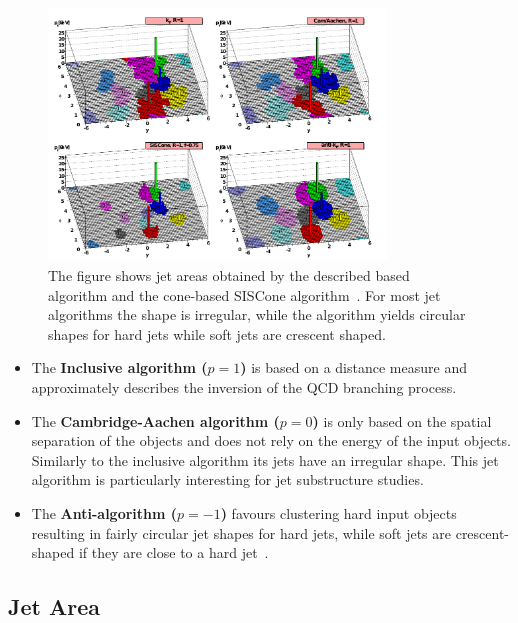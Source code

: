 \begin{figure}[htb]
    \centering
    \includegraphics[width=0.8\textwidth]{figures/jet_reconstruction/jet_shapes.pdf}
    \caption{The figure shows jet areas obtained by the described \kt based algorithm
        and the cone-based SISCone algorithm~\cite{Salam:2009jx}. For most jet
        algorithms the shape is irregular, while the \antikt algorithm yields
        circular shapes for hard jets while soft jets are crescent shaped.}
    \label{fig:jet_shapes}
\end{figure}

\begin{itemize}
    \item The \textbf{Inclusive \kt algorithm ($p=1$)} is based on a \ptsq
        distance measure and approximately describes the inversion
        of the QCD branching process.
    \item The \textbf{Cambridge-Aachen algorithm ($p=0$)} is only based on the
        spatial separation of the objects and does not rely on the energy of
        the input objects. Similarly to the inclusive \kt algorithm its jets
        have an irregular shape. This jet algorithm is particularly interesting
        for jet substructure studies.
    \item The \textbf{Anti-\kt algorithm ($p=-1$)} favours clustering hard input
        objects resulting in fairly circular jet shapes for hard jets, while
        soft jets are crescent-shaped if they are close to a hard jet~\cite{Cacciari:2008gp}.
\end{itemize}

\subsection{Jet Area}

